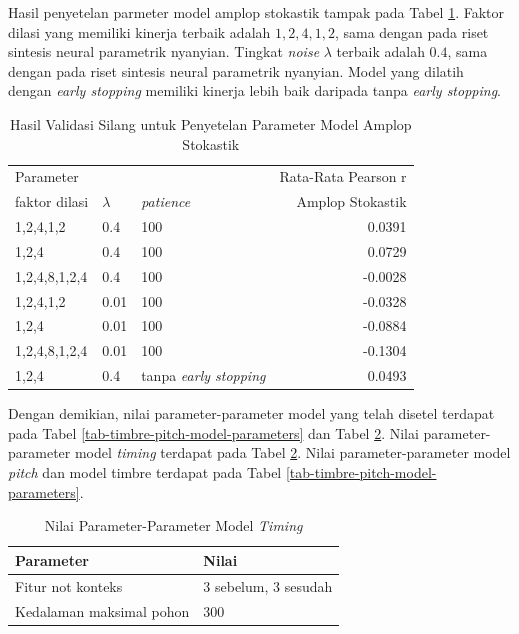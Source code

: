 Hasil penyetelan parmeter model amplop stokastik tampak pada Tabel \ref{tab-stoc-model-tuning-results}. Faktor dilasi yang memiliki kinerja terbaik adalah $1,2,4,1,2$, sama dengan pada riset sintesis neural parametrik nyanyian. Tingkat \textit{noise} $\lambda$ terbaik adalah $0.4$, sama dengan pada riset sintesis neural parametrik nyanyian. Model yang dilatih dengan \textit{early stopping} memiliki kinerja lebih baik daripada tanpa \textit{early stopping}.

\begin{table}[htbp]
    \centering
    \caption{Hasil Validasi Silang untuk Penyetelan Parameter Model Amplop Stokastik}\label{tab-stoc-model-tuning-results}
    \begin{tabular}{ |l|l|l|r| } 
     \hline
     \multicolumn{3}{|l|}{Parameter} & Rata-Rata Pearson r\\
     \cline{1-3}
     faktor dilasi & $\lambda$ & \textit{patience} & Amplop Stokastik\\
	 \hline 
	1,2,4,1,2& 0.4& 100           & 0.0391\\\hline
	1,2,4& 0.4& 100               & 0.0729\\\hline
	1,2,4,8,1,2,4& 0.4& 100       &-0.0028\\\hline
	1,2,4,1,2& 0.01& 100          &-0.0328\\\hline
	1,2,4& 0.01& 100              &-0.0884\\\hline
	1,2,4,8,1,2,4& 0.01& 100      &-0.1304\\\hline
	1,2,4& 0.4& tanpa \textit{early stopping}       & 0.0493\\\hline
    \end{tabular}
\end{table}

Dengan demikian, nilai parameter-parameter model yang telah disetel terdapat pada Tabel \ref{tab-timbre-pitch-model-parameters} dan Tabel \ref{tab-timing-model-parameters}. Nilai parameter-parameter model \textit{timing} terdapat pada Tabel \ref{tab-timing-model-parameters}. Nilai parameter-parameter model \textit{pitch} dan model timbre terdapat pada Tabel \ref{tab-timbre-pitch-model-parameters}.
\begin{table}[htbp]
	\centering
	\caption{Nilai Parameter-Parameter Model \textit{Timing}}\label{tab-timing-model-parameters}
	\begin{tabular}{|l|l|}
	\hline
	Parameter&Nilai \\\hline
	Fitur not konteks & 3 sebelum, 3 sesudah\\\hline
	Kedalaman maksimal pohon & 300\\\hline
	\end{tabular}
\end{table}


